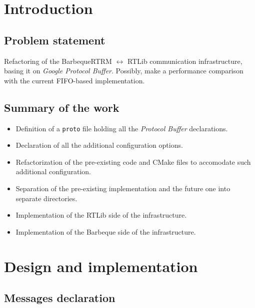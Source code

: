 \section{Introduction}


\subsection{Problem statement}
Refactoring of the BarbequeRTRM $\leftrightarrow$ RTLib communication infrastructure, basing it on \emph{Google Protocol Buffer}. Possibly, make a performance comparison with the current FIFO-based implementation.

\subsection{Summary of the work}
\begin{itemize}
    \item Definition of a \texttt{proto} file holding all the \emph{Protocol Buffer} declarations.
    \item Declaration of all the additional configuration options.
    \item Refactorization of the pre-existing code and CMake files to accomodate such additional configuration.
    \item Separation of the pre-existing implementation and the future one into separate directories.
    \item Implementation of the RTLib side of the infrastructure.
    \item Implementation of the Barbeque side of the infrastructure.
\end{itemize}

\pagebreak

\section{Design and implementation}


\subsection{Messages declaration}
\label{sec:messages-declaration}

